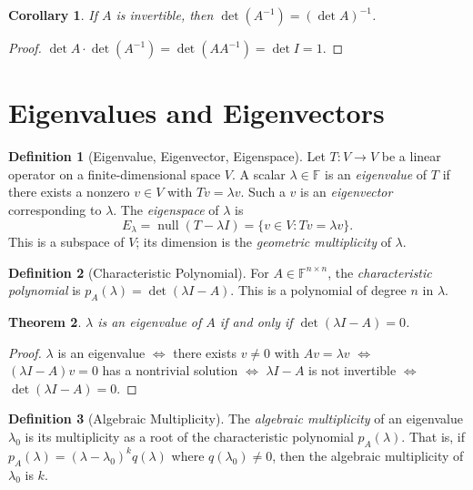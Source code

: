 \documentclass[11pt,a4paper]{article}
\theoremstyle{definition}
\newtheorem{definition}{Definition}[section]
\theoremstyle{plain}
\newtheorem{theorem}{Theorem}[section]
\newtheorem{corollary}[theorem]{Corollary}
\theoremstyle{remark}
\newcommand{\F}{\mathbb{F}}
\DeclareMathOperator{\nullspace}{null}
\begin{document}
\begin{corollary}
\label{cor:det_inverse}
If $A$ is invertible, then $\det(A^{-1}) = (\det A)^{-1}$.
\end{corollary}

\begin{proof}
$\det A \cdot \det(A^{-1}) = \det(AA^{-1}) = \det I = 1$.
\end{proof}

\section{Eigenvalues and Eigenvectors}
\label{sec:eigenvalues}

\begin{definition}[Eigenvalue, Eigenvector, Eigenspace]
\label{def:eigenvalue}
Let $T: V \to V$ be a linear operator on a finite-dimensional space $V$. A scalar
$\lambda \in \F$ is an \emph{eigenvalue} of $T$ if there exists a nonzero $v \in V$ with
$Tv = \lambda v$. Such a $v$ is an \emph{eigenvector} corresponding to $\lambda$.
The \emph{eigenspace} of $\lambda$ is
\[
    E_\lambda = \nullspace(T - \lambda I) = \{v \in V : Tv = \lambda v\}.
\]
This is a subspace of $V$; its dimension is the \emph{geometric multiplicity} of $\lambda$.
\end{definition}

\begin{definition}[Characteristic Polynomial]
\label{def:char_poly}
For $A \in \F^{n \times n}$, the \emph{characteristic polynomial} is
$p_A(\lambda) = \det(\lambda I - A)$. This is a polynomial of degree $n$ in $\lambda$.
\end{definition}

\begin{theorem}
\label{thm:eigenvalues_are_roots}
$\lambda$ is an eigenvalue of $A$ if and only if $\det(\lambda I - A) = 0$.
\end{theorem}

\begin{proof}
$\lambda$ is an eigenvalue $\iff$ there exists $v \neq 0$ with $Av = \lambda v$ $\iff$
$(\lambda I - A)v = 0$ has a nontrivial solution $\iff$ $\lambda I - A$ is not invertible
$\iff$ $\det(\lambda I - A) = 0$.
\end{proof}

\begin{definition}[Algebraic Multiplicity]
\label{def:algebraic_mult}
The \emph{algebraic multiplicity} of an eigenvalue $\lambda_0$ is its multiplicity as a
root of the characteristic polynomial $p_A(\lambda)$. That is, if $p_A(\lambda) =
(\lambda - \lambda_0)^k q(\lambda)$ where $q(\lambda_0) \neq 0$, then the algebraic
multiplicity of $\lambda_0$ is $k$.
\end{definition}
\end{document}
